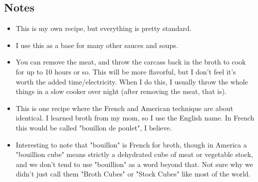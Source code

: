 \begin{multicols}{2}
\subsection*{Notes}
\begin{itemize}
    \item This is my own recipe, but everything is pretty standard.
    \item I use this as a base for many other sauces and soups.
    \item You can remove the meat, and throw the carcass back in the broth to cook for up to 10 hours or so. This will be more flavorful, but I don't feel it's worth the added time/electricity. When I do this, I usually throw the whole things in a slow cooker over night (after removing the meat, that is).
    \item This is one recipe where the French and American technique are about identical. I learned broth from my mom, so I use the English name. In French this would be called "bouillon de poulet", I believe.
    \item Interesting to note that "bouillon" is French for broth, though in America a "bouillion cube" means strictly a dehydrated cube of meat or vegetable stock, and we don't tend to use "bouillion" as a word beyond that. Not sure why we didn't just call them "Broth Cubes" or "Stock Cubes" like most of the world.
\end{itemize}
\end{multicols}
\clearpage